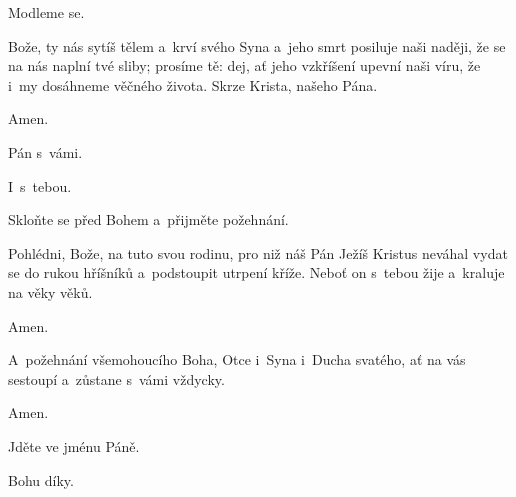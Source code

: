 \mbox{}

Modleme se.

Bože, ty nás sytíš tělem a~krví svého Syna a~jeho smrt posiluje naši naději, že se na nás naplní tvé sliby; prosíme tě: dej, ať jeho vzkříšení upevní naši víru, že i~my dosáhneme věčného života. Skrze Krista, našeho Pána.

\Rbardot{} Amen.

\mbox{}

\Vbardot{} Pán s~vámi.

\Rbardot{} I~s~tebou.

\Vbardot{} Skloňte se před Bohem a~přijměte požehnání.

Pohlédni, Bože, na tuto svou rodinu, pro niž náš Pán Ježíš Kristus neváhal vydat se do rukou hříšníků a~podstoupit utrpení kříže. Neboť on s~tebou žije a~kraluje na věky věků.

\Rbardot{} Amen.

A~požehnání všemohoucího Boha, Otce i~Syna \grecross{} i~Ducha svatého, ať na vás sestoupí a~zůstane s~vámi vždycky.

\Rbardot{} Amen.

\Vbardot{} Jděte ve jménu Páně.

\Rbardot{} Bohu díky.
